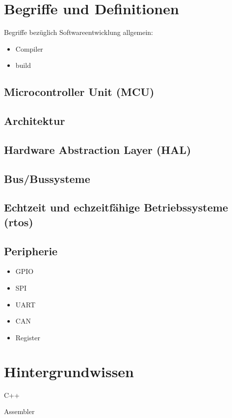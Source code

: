 \section{Begriffe und Definitionen}
Begriffe bezüglich Softwareentwicklung allgemein:
\begin{itemize}
	\item Compiler
	\item build
\end{itemize}


\subsection*{Microcontroller Unit (MCU)}

\subsection*{Architektur}

\subsection*{Hardware Abstraction Layer (HAL)}

\subsection*{Bus/Bussysteme}

\subsection*{Echtzeit und echzeitfähige Betriebssysteme (\gls{rtos})}

\subsection*{Peripherie}
\begin{itemize}
	\item GPIO
	\item SPI
	\item UART
	\item CAN
	\item Register %
\end{itemize}


\section{Hintergrundwissen}
C++

Assembler



